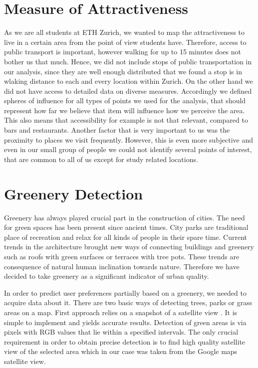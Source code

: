 \documentclass[letterpaper]{article}
\begin{document}
\section{Measure of Attractiveness}\label{sec:attractiveness}
As we are all students at ETH Zurich, we wanted to map the attractiveness to live in a certain area from the point of view students have.
Therefore, access to public transport is important, however walking for up to 15 minutes does not bother us that much. Hence, we did not
include stops of public transportation in our analysis, since they are well enough distributed that we found a stop is in wlaking distance
to each and every location within Zurich.
On the other hand we did not have access to detailed data on diverse measures. Accordingly we defined spheres of influence for all types
of points we used for the analysis, that should represent how far we believe that item will influence how we perceive the area.
This also means that accessibility for example is not that relevant, compared to bars and restaurants. Another factor that is
very important to us was the proximity to places we visit frequently. However, this is even more subjective and even in our
small group of people we could not identify several points of interest, that are common to all of us except for study related locations.

\section{Greenery Detection}\label{sec:greenery}
\indent Greenery has always played crucial part in the construction of cities. The need for green spaces has been present since ancient times.
City parks are traditional place of recreation and relax for all kinds of people in their spare time. Current trends in the architecture brought new ways of
connecting buildings and greenery such as roofs with green surfaces or terraces with tree pots. These trends are consequence of natural
human inclination towards nature. Therefore we have decided to take greenery as a significant indicator of urban quality.

\indent In order to predict user preferences partially based on a greenery, we needed to acquire data about it. There are two basic ways of detecting trees,
parks or grass areas on a map. First approach relies on a snapshot of a satellite view \cite{smartCities}. It is simple to implement and yields accurate results.
Detection of green areas is via pixels with RGB values that lie within a specified intervals. The only crucial requirement in order to obtain precise detection
is to find high quality satellite view of the selected area which in our case was taken from the Google maps satellite view.
\end{document}
